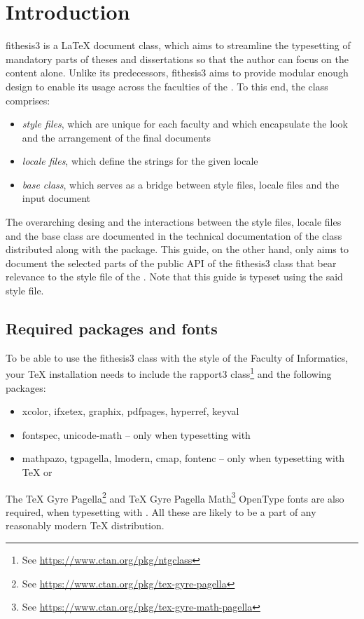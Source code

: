 \documentclass[color,cover,twoside,nolot]{../../fithesis3}
\begin{document}
  \makeatletter\thesis@preamble\makeatother
  \chapter{Introduction}
  \textsf{fithesis3} is a \LaTeX{} document class, which
  aims to streamline the typesetting of mandatory parts of theses
  and dissertations so that the author can focus on the content
  alone. Unlike its predecessors, \textsf{fithesis3} aims to
  provide modular enough design to enable its usage across the
  faculties of the \makeatletter\thesis@english@universityName%
  \makeatother. To this end, the class comprises:
  \begin{itemize}
    \item\emph{style files}, which are unique for each faculty and
      which encapsulate the look and the arrangement of the final
      documents
    \item\emph{locale files}, which define the strings for the
      given locale
    \item\emph{base class}, which serves as a bridge between style
      files, locale files and the input document
  \end{itemize}
  The overarching desing and the interactions between the style
  files, locale files and the base class are documented in the
  technical documentation of the class \cite{novotny15}
  distributed along with the package. This
  guide, on the other hand, only aims to document the selected
  parts of the public API of the \textsf{fithesis3} class
  that bear relevance to the style file of the
  \makeatletter\thesis@english@facultyName\makeatother. Note that
  this guide is typeset using the said style file.

  \section{Required packages and fonts}
  To be able to use the \textsf{fithesis3} class with the style of
  the Faculty of Informatics, your \TeX{} installation needs to
  include the \textsf{rapport3} class\footnote{See
  \url{https://www.ctan.org/pkg/ntgclass}} and the following
  packages: \begin{itemize}
    \item\textsf{xcolor}, \textsf{ifxetex}, \textsf{graphix},
      \textsf{pdfpages}, \textsf{hyperref}, \textsf{keyval}
    \item\textsf{fontspec}, \textsf{unicode-math} -- only when
      typesetting with 
    \item\textsf{mathpazo}, \textsf{tgpagella}, \textsf{lmodern},
       \textsf{cmap}, \textsf{fontenc} -- only when typesetting
       with \TeX{} or 
  \end{itemize}
  The \TeX{} Gyre Pagella\footnote{See
  \url{https://www.ctan.org/pkg/tex-gyre-pagella}} and
  \TeX{} Gyre Pagella Math\footnote{See
  \url{https://www.ctan.org/pkg/tex-gyre-math-pagella}} OpenType
  fonts are also required, when typesetting with .
  All these are likely to be a part of any reasonably modern \TeX{}
  distribution.
\end{document}
